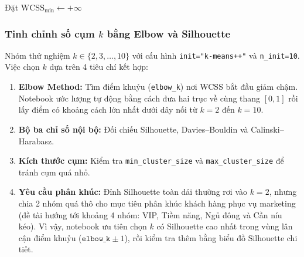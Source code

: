 \documentclass[12pt,a4paper]{article}
\numberwithin{equation}{section}
\numberwithin{table}{section}
\numberwithin{figure}{section}
\begin{document}
\begin{algorithm}[H]
\caption{Thuật toán K-Means (Lloyd kết hợp \texttt{k-means++})}
\label{alg:kmeans}
Đặt $\mathrm{WCSS}_{\min} \leftarrow +\infty$\;
\;
\end{algorithm}

\subsubsection{Tinh chỉnh số cụm \texorpdfstring{$k$}{k} bằng Elbow và Silhouette}
\label{subsubsec:kmeans_tuning}

Nhóm thử nghiệm $k \in \{2, 3, \ldots, 10\}$ với cấu hình \texttt{init="k-means++"} và \texttt{n\_init=10}. Việc chọn $k$ dựa trên 4 tiêu chí kết hợp:
\begin{enumerate}[leftmargin=1.8em]
    \item \textbf{Elbow Method:} Tìm điểm khuỷu (\texttt{elbow\_k}) nơi WCSS bắt đầu giảm chậm. Notebook ước lượng tự động bằng cách đưa hai trục về cùng thang $[0, 1]$ rồi lấy điểm có khoảng cách lớn nhất dưới dây nối từ $k=2$ đến $k=10$.
    \item \textbf{Bộ ba chỉ số nội bộ:} Đối chiếu Silhouette, Davies--Bouldin và Calinski--Harabasz.
    \item \textbf{Kích thước cụm:} Kiểm tra \texttt{min\_cluster\_size} và \texttt{max\_cluster\_size} để tránh cụm quá nhỏ.
    \item \textbf{Yêu cầu phân khúc:} Đỉnh Silhouette toàn dải thường rơi vào $k=2$, nhưng chia 2 nhóm quá thô cho mục tiêu phân khúc khách hàng phục vụ marketing (đề tài hướng tới khoảng 4 nhóm: VIP, Tiềm năng, Ngủ đông và Cần níu kéo). Vì vậy, notebook ưu tiên chọn $k$ có Silhouette cao nhất trong vùng lân cận điểm khuỷu ($\texttt{elbow\_k} \pm 1$), rồi kiểm tra thêm bằng biểu đồ Silhouette chi tiết.
\end{enumerate}
\end{document}
